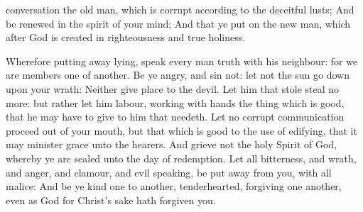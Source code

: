 {conversation the
old
man, which
is
corrupt according
to the
deceitful
lusts;
And be
renewed in the
spirit of
your
mind;
And that ye put
on the
new
man,
which
after
God is
created
in
righteousness
and
true
holiness.
\par }{\PP {}Wherefore putting
away
lying,
speak every
man
truth
with
his
neighbour:
for we
are
members one of
another.
Be ye
angry,
and
sin
not:
let
not the
sun go
down
upon
your
wrath:
Neither
give
place to the
devil.
Let
him
that
stole
steal no
more:
but
rather let
him
labour,
working
with
{}
hands the thing which
is
good,
that he may
have to
give to him
that
needeth.
Let
no
corrupt
communication
proceed out
of
your
mouth,
but
that which
is
good
to the
use of
edifying,
that it may
minister
grace unto the
hearers.
And
grieve
not the
holy
Spirit of
God,
whereby ye are
sealed
unto the
day of
redemption.
Let
all
bitterness,
and
wrath,
and
anger,
and
clamour,
and evil
speaking, be put
away
from
you,
with
all
malice:
And be
ye
kind
one
to
another,
tenderhearted,
forgiving one
another,
even
as
God
for
Christ’s sake hath
forgiven
you.

}
